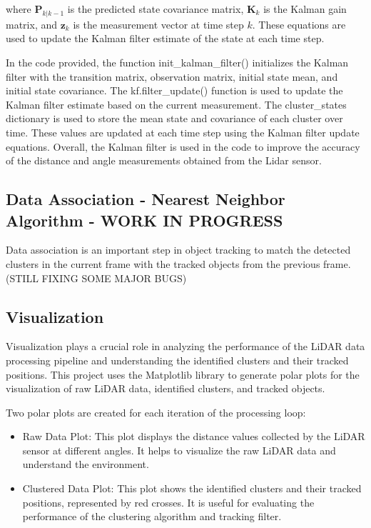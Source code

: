 \documentclass[journal]{IEEEtran} %
\begin{document}
where $\mathbf{P}_{k|k-1}$ is the predicted state covariance matrix, $\mathbf{K}_k$ is the Kalman gain matrix, and $\mathbf{z}_k$ is the measurement vector at time step $k$. These equations are used to update the Kalman filter estimate of the state at each time step.

In the code provided, the function init\_kalman\_filter() initializes the Kalman filter with the transition matrix, observation matrix, initial state mean, and initial state covariance. The kf.filter\_update() function is used to update the Kalman filter estimate based on the current measurement. The cluster\_states dictionary is used to store the mean state and covariance of each cluster over time. These values are updated at each time step using the Kalman filter update equations. Overall, the Kalman filter is used in the code to improve the accuracy of the distance and angle measurements obtained from the Lidar sensor.

\subsection{Data Association - Nearest Neighbor Algorithm - WORK IN PROGRESS}

Data association is an important step in object tracking to match the detected clusters in the current frame with the tracked objects from the previous frame. (STILL FIXING SOME MAJOR BUGS)

\subsection{Visualization}

Visualization plays a crucial role in analyzing the performance of the LiDAR data processing pipeline and understanding the identified clusters and their tracked positions. This project uses the Matplotlib library to generate polar plots for the visualization of raw LiDAR data, identified clusters, and tracked objects.

Two polar plots are created for each iteration of the processing loop:
\begin{itemize}

\item Raw Data Plot: This plot displays the distance values collected by the LiDAR sensor at different angles. It helps to visualize the raw LiDAR data and understand the environment.

\item Clustered Data Plot: This plot shows the identified clusters and their tracked positions, represented by red crosses. It is useful for evaluating the performance of the clustering algorithm and tracking filter.

\end{itemize}
\end{document}
